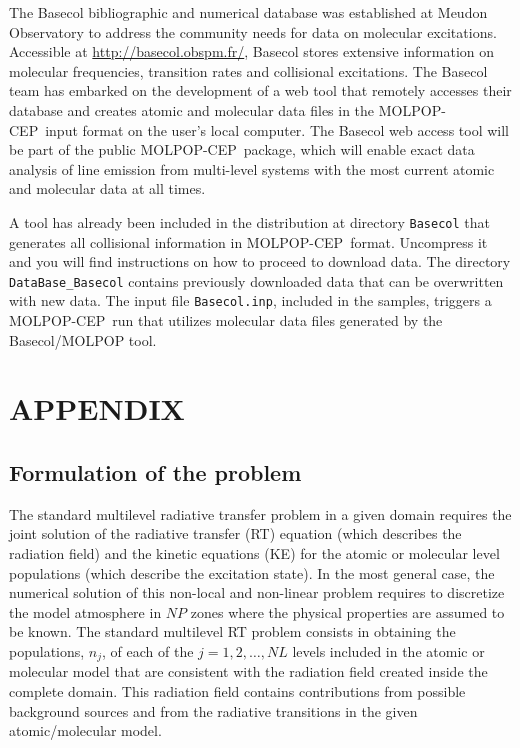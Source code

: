 \documentclass[12pt]{article}
\def\M{MOLPOP-CEP}
\begin{document}
The Basecol bibliographic and numerical database was established at Meudon
Observatory to address the community needs for data on molecular excitations.
Accessible at \url{http://basecol.obspm.fr/}, Basecol stores extensive
information on molecular frequencies, transition rates and collisional
excitations. The Basecol team has embarked on the development of a web tool
that remotely accesses their database and creates atomic and molecular data
files in the \M\ input format on the user's local computer. The Basecol web
access tool will be part of the public \M\ package, which will enable exact
data analysis of line emission from multi-level systems with the most current
atomic and molecular data at all times.

A tool has already been included in the
distribution at directory {\tt Basecol} that generates all collisional
information in \M\ format. Uncompress it and you will find
instructions on how to proceed to download data. The directory
{\tt DataBase\_Basecol} contains previously downloaded data that
can be overwritten with new data. The input file {\tt Basecol.inp}, included in the samples, triggers a \M\ run
that utilizes molecular data files generated by the Basecol/MOLPOP tool.



\newpage
\appendix

\section{APPENDIX}

\subsection{Formulation of the problem}

The standard multilevel radiative transfer problem in a given domain requires
the joint solution of the radiative transfer (RT) equation (which describes the
radiation field) and the kinetic equations (KE) for the atomic or molecular
level populations (which describe the excitation state). In the most general
case, the numerical solution of this non-local and non-linear problem requires
to discretize the model atmosphere in $NP$ zones where the physical properties
are assumed to be known. The standard multilevel RT problem consists in
obtaining the populations, $n_j$, of each of the $j=1,2,\ldots,NL$ levels
included in the atomic or molecular model that are consistent with the
radiation field created inside the complete domain. This radiation field
contains contributions from possible background sources and from the radiative
transitions in the given atomic/molecular model.
\end{document}
